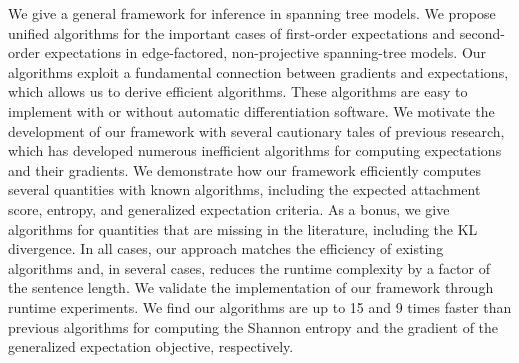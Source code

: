 We give a general framework for inference in spanning tree models. We propose unified algorithms for the important cases of first-order expectations and second-order expectations in edge-factored, non-projective spanning-tree models. Our algorithms exploit a fundamental connection between gradients and expectations, which allows us to derive efficient algorithms. These algorithms are easy to implement with or without automatic differentiation software. We motivate the development of our framework with several cautionary tales of previous research, which has developed numerous inefficient algorithms for computing expectations and their gradients. We demonstrate how our framework efficiently computes several quantities with known algorithms, including the expected attachment score, entropy, and generalized expectation criteria. As a bonus, we give algorithms for quantities that are missing in the literature, including the KL divergence. In all cases, our approach matches the efficiency of existing algorithms and, in several cases, reduces the runtime complexity by a factor of the sentence length. We validate the implementation of our framework through runtime experiments. We find our algorithms are up to 15 and 9 times faster than previous algorithms for computing the Shannon entropy and the gradient of the generalized expectation objective, respectively.